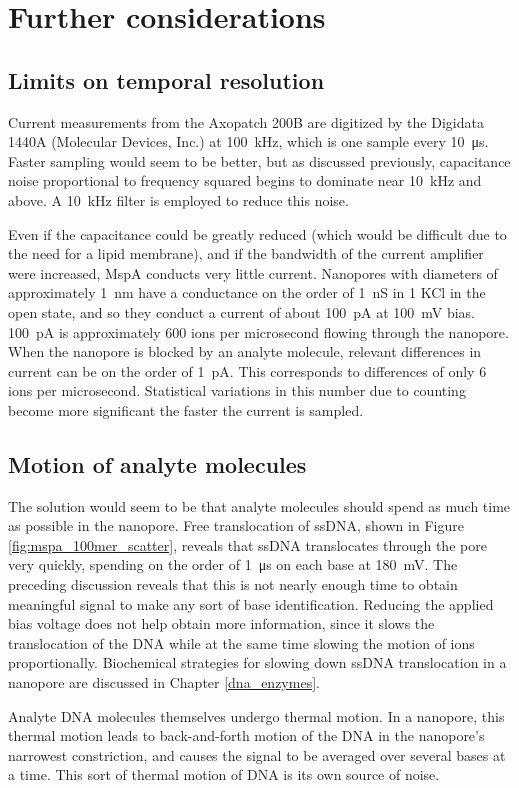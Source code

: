 \section{Further considerations}

\subsection{Limits on temporal resolution}

Current measurements from the Axopatch 200B are digitized by the Digidata 1440A (Molecular Devices, Inc.) at \SI{100}{\kHz}, which is one sample every \SI{10}{\us}.  Faster sampling would seem to be better, but as discussed previously, capacitance noise proportional to frequency squared begins to dominate near \SI{10}{\kHz} and above.  A \SI{10}{\kHz} filter is employed to reduce this noise.

Even if the capacitance could be greatly reduced (which would be difficult due to the need for a lipid membrane), and if the bandwidth of the current amplifier were increased, MspA conducts very little current.  Nanopores with diameters of approximately \SI{1}{\nm} have a conductance on the order of \SI{1}{\nano\siemens} in \SI{1}{\Molar} KCl in the open state, and so they conduct a current of about \SI{100}{\pA} at \SI{100}{\mV} bias.  \SI{100}{\pA} is approximately \num{600} ions per microsecond flowing through the nanopore.  When the nanopore is blocked by an analyte molecule, relevant differences in current can be on the order of \SI{1}{\pA}.  This corresponds to differences of only \num{6} ions per microsecond.  Statistical variations in this number due to counting become more significant the faster the current is sampled.

\subsection{Motion of analyte molecules}

The solution would seem to be that analyte molecules should spend as much time as possible in the nanopore.  Free translocation of ssDNA, shown in Figure \ref{fig:mspa_100mer_scatter}, reveals that ssDNA translocates through the pore very quickly, spending on the order of \SI{1}{\us} on each base at \SI{180}{\mV}.  The preceding discussion reveals that this is not nearly enough time to obtain meaningful signal to make any sort of base identification.  Reducing the applied bias voltage does not help obtain more information, since it slows the translocation of the DNA while at the same time slowing the motion of ions proportionally.  Biochemical strategies for slowing down ssDNA translocation in a nanopore are discussed in Chapter \ref{dna_enzymes}.

Analyte DNA molecules themselves undergo thermal motion.  In a nanopore, this thermal motion leads to back-and-forth motion of the DNA in the nanopore's narrowest constriction, and causes the signal to be averaged over several bases at a time.  This sort of thermal motion of DNA is its own source of noise.
